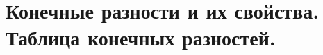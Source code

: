\documentclass[../../calc-math-exam-2023.tex]{subfiles}
\begin{document}
\section{Конечные разности и их свойства. Таблица конечных разностей.}
\end{document}
